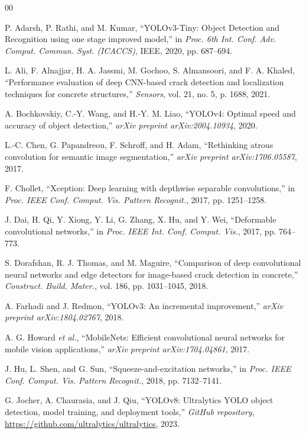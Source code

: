 \documentclass{ieeeaccess}
\begin{document}
{\begin{thebibliography}{00}

 P. Adarsh, P. Rathi, and M. Kumar, ``YOLOv3-Tiny: Object Detection and Recognition using one stage improved model,'' in \emph{Proc. 6th Int. Conf. Adv. Comput. Commun. Syst. (ICACCS)}, IEEE, 2020, pp. 687--694.

 L. Ali, F. Alnajjar, H. A. Jassmi, M. Gochoo, S. Almansoori, and F. A. Khaled, ``Performance evaluation of deep CNN-based crack detection and localization techniques for concrete structures,'' \emph{Sensors}, vol. 21, no. 5, p. 1688, 2021.

 A. Bochkovskiy, C.-Y. Wang, and H.-Y. M. Liao, ``YOLOv4: Optimal speed and accuracy of object detection,'' \emph{arXiv preprint arXiv:2004.10934}, 2020.

 L.-C. Chen, G. Papandreou, F. Schroff, and H. Adam, ``Rethinking atrous convolution for semantic image segmentation,'' \emph{arXiv preprint arXiv:1706.05587}, 2017.

 F. Chollet, ``Xception: Deep learning with depthwise separable convolutions,'' in \emph{Proc. IEEE Conf. Comput. Vis. Pattern Recognit.}, 2017, pp. 1251--1258.

 J. Dai, H. Qi, Y. Xiong, Y. Li, G. Zhang, X. Hu, and Y. Wei, ``Deformable convolutional networks,'' in \emph{Proc. IEEE Int. Conf. Comput. Vis.}, 2017, pp. 764--773.

 S. Dorafshan, R. J. Thomas, and M. Maguire, ``Comparison of deep convolutional neural networks and edge detectors for image-based crack detection in concrete,'' \emph{Construct. Build. Mater.}, vol. 186, pp. 1031--1045, 2018.

 A. Farhadi and J. Redmon, ``YOLOv3: An incremental improvement,'' \emph{arXiv preprint arXiv:1804.02767}, 2018.

 A. G. Howard \emph{et al.}, ``MobileNets: Efficient convolutional neural networks for mobile vision applications,'' \emph{arXiv preprint arXiv:1704.04861}, 2017.

 J. Hu, L. Shen, and G. Sun, ``Squeeze-and-excitation networks,'' in \emph{Proc. IEEE Conf. Comput. Vis. Pattern Recognit.}, 2018, pp. 7132--7141.

 G. Jocher, A. Chaurasia, and J. Qiu, ``YOLOv8: Ultralytics YOLO object detection, model training, and deployment tools,'' \emph{GitHub repository}, \url{https://github.com/ultralytics/ultralytics}, 2023.


\end{thebibliography}}
\end{document}
